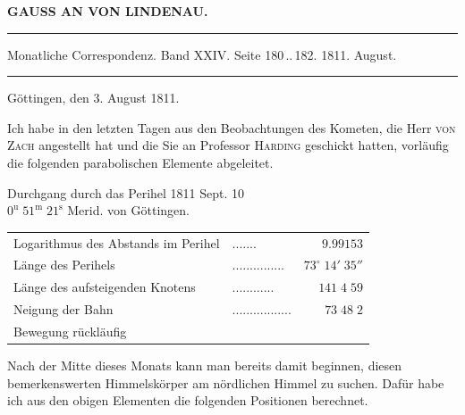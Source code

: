 \clearpage{}\hypertarget{native-331-lower}{}\label{native-331-lower}
\begin{center}\textbf{GAUSS AN VON LINDENAU.}\par\vspace{4pt}\hrule\vspace{4pt}\fontsize{10}{12}\selectfont Monatliche Correspondenz. Band XXIV. Seite 180\,..\,182. 1811. August.\par\vspace{4pt}\hrule\vspace{4pt}\end{center}

\begin{flushright}Göttingen, den 3. August 1811.\end{flushright}
\par\indent Ich habe in den letzten Tagen aus den Beobachtungen des Kometen, die Herr \textsc{von Zach} angestellt hat und die Sie an Professor \textsc{Harding} geschickt hatten, vorläufig die folgenden parabolischen Elemente abgeleitet.
\begin{center}\fontsize{10}{12}\selectfont Durchgang durch das Perihel 1811 Sept. 10\\$0^{\text{u}}\;51^{\text{m}}\;21^{\text{s}}$ Merid. von Göttingen.\end{center}

\begin{center}\fontsize{10}{12}\selectfont\setlength{\tabcolsep}{4pt}\renewcommand{\arraystretch}{1.15}\begin{tabular}{llr}
Logarithmus des Abstands im Perihel & .\;.\;.\;.\;.\;.\;. & $9.99153$\\
Länge des Perihels & .\;.\;.\;.\;.\;.\;.\;.\;.\;.\;.\;.\;.\;.\;. & $73^\circ\;14'\;35''$\\
Länge des aufsteigenden Knotens & .\;.\;.\;.\;.\;.\;.\;.\;.\;.\;.\;. & $141\;4\;59$\\
Neigung der Bahn & .\;.\;.\;.\;.\;.\;.\;.\;.\;.\;.\;.\;.\;.\;.\;.\;. & $73\;48\;2$\\
Bewegung rückläufig &  & \\
\end{tabular}\end{center}

\par\indent Nach der Mitte dieses Monats kann man bereits damit beginnen, diesen bemerkenswerten Himmelskörper am nördlichen Himmel zu suchen. Dafür habe ich aus den obigen Elementen die folgenden Positionen berechnet.

